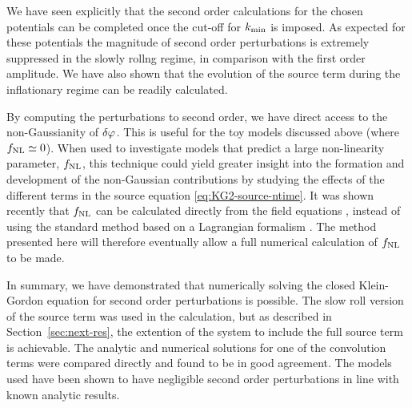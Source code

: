 We have seen explicitly that the second order calculations for the chosen
potentials can be completed once the cut-off for $k_{\mathrm{min}}$ is
imposed. As expected for these potentials the magnitude of second order perturbations
is extremely
suppressed in the slowly rollng regime, in comparison with the first order amplitude.
We have also shown that the
evolution of the source term during the inflationary regime can be
readily calculated.


By computing the perturbations to second order, we have direct access
to the non-Gaussianity of $\delta\varphi_{}$.  This is useful for the toy models
discussed above (where $f_{\mathrm{NL}}\simeq0$). When used to investigate models
that predict a large non-linearity parameter, $f_{\mathrm{NL}}$, this technique
could yield greater insight into the formation and development of the
non-Gaussian contributions by studying the effects of the different
terms in the source equation \eqref{eq:KG2-source-ntime}.
%
It was shown recently that $f_{\mathrm{NL}}$ can be calculated directly from the field
equations \cite{Musso:2006pt,Seery:2008qj}, instead of
using the standard method based on a Lagrangian formalism
\cite{Maldacena:2002vr}. The method presented here
will
therefore eventually allow a full numerical calculation of $f_{\mathrm{NL}}$ to be made.


In summary, we have demonstrated that numerically solving the closed
Klein-Gordon equation for second order perturbations is possible. The slow roll
version of the source term was used in the calculation, but
as described in Section~\ref{sec:next-res}, the extention of the system to include
the full source term is achievable. 
The analytic and numerical solutions for one of the convolution terms were
compared directly and found to be in good agreement.
The models used have been shown to have negligible second order
perturbations in line with known analytic results. 
